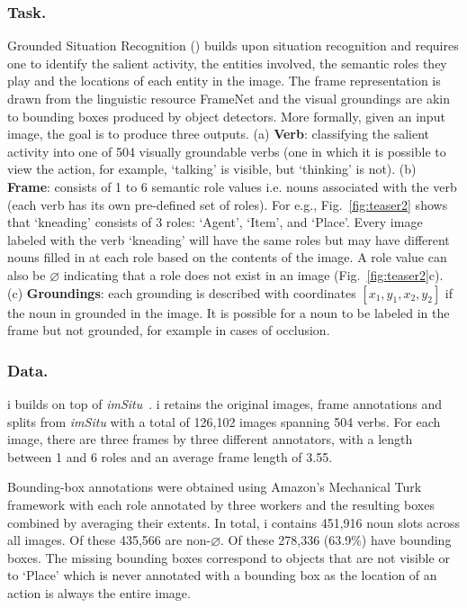 \documentclass[runningheads]{llncs}
\newcommand{\dataset}{\mbox{\sc{SW}}i\mbox{\sc{G}}\xspace}
\newcommand{\imsitu}{\emph{imSitu}\xspace}
\newcommand{\tasksmall}{\mbox{\sc{GSR}}\xspace}
\begin{document}
\subsubsection{Task. }
Grounded Situation Recognition (\tasksmall) builds upon situation recognition and requires one to identify the salient activity, the entities involved, the semantic roles they play and the locations of each entity in the image. The frame representation is drawn from the linguistic resource FrameNet and the visual groundings are akin to bounding boxes produced by object detectors. More formally, given an input image, the goal is to produce three outputs. (a) \textbf{Verb}: classifying the salient activity into one of 504 visually groundable verbs (one in which it is possible to view the action, for example, ‘talking’ is visible, but ‘thinking’ is not). (b) \textbf{Frame}: consists of 1 to 6 semantic role values i.e. nouns associated with the verb (each verb has its own pre-defined set of roles). For e.g., Fig.~\ref{fig:teaser2} shows that ‘kneading’ consists of 3 roles: ‘Agent’, ‘Item’, and ‘Place’. Every image labeled with the verb ‘kneading’ will have the same roles but may have different nouns filled in at each role based on the contents of the image. A role value can also be $\varnothing$ indicating that a role does not exist in an image (Fig.~\ref{fig:teaser2}c). (c) \textbf{Groundings}: each grounding is described with coordinates $[x_1, y_1, x_2, y_2]$ if the noun in grounded in the image. It is possible for a noun to be labeled in the frame but not grounded, for example in cases of occlusion.

\subsubsection{Data. }

\dataset{} builds on top of \imsitu{}~\cite{imsitu}. \dataset{} retains the original images, frame annotations and splits from \imsitu{} with a total of 126,102 images spanning 504 verbs. For each image, there are three frames by three different annotators, with a length between 1 and 6 roles and an average frame length of 3.55.


Bounding-box annotations were obtained using Amazon's Mechanical Turk framework with each role annotated by three workers and the resulting boxes combined by averaging their extents. In total, \dataset{} contains 451,916 noun slots across all images. Of these 435,566 are non-$\varnothing$. Of these 278,336 (63.9\%) have bounding boxes. The missing bounding boxes correspond to objects that are not visible or to `Place' which is never annotated with a bounding box as the location of an action is always the entire image.
\end{document}
